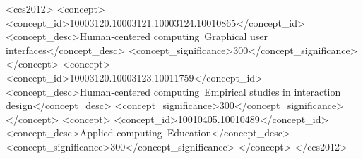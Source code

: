 \documentclass[english]{programming}
\begin{document}

\begin{CCSXML}
	<ccs2012>
	<concept>
	<concept_id>10003120.10003121.10003124.10010865</concept_id>
	<concept_desc>Human-centered computing~Graphical user interfaces</concept_desc>
	<concept_significance>300</concept_significance>
	</concept>
	<concept>
	<concept_id>10003120.10003123.10011759</concept_id>
	<concept_desc>Human-centered computing~Empirical studies in interaction design</concept_desc>
	<concept_significance>300</concept_significance>
	</concept>
	<concept>
	<concept_id>10010405.10010489</concept_id>
	<concept_desc>Applied computing~Education</concept_desc>
	<concept_significance>300</concept_significance>
	</concept>
	</ccs2012>
	
\end{CCSXML}



\maketitle

\begin{abstract}
  
\end{abstract}



\noindent 

\newpage

\printbibliography


\newpage
\appendix

\end{document}
